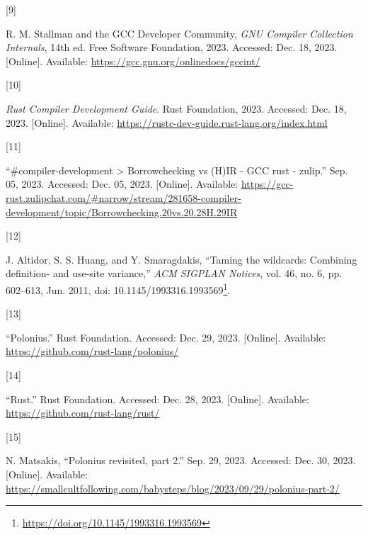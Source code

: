 \documentclass[
  11pt,
  twoside,symmetric]{report}
\newlength{\cslhangindent}
\newlength{\csllabelwidth}
\newlength{\cslentryspacingunit} %
\newenvironment{CSLReferences}[2] %
 {%
  \setlength{\parindent}{0pt}
  \ifodd #1
  \let\oldpar\par
  \def\par{\hangindent=\cslhangindent\oldpar}
  \fi
  \setlength{\parskip}{#2\cslentryspacingunit}
 }%
 {}
\newcommand{\CSLLeftMargin}[1]{\parbox[t]{\csllabelwidth}{#1}}
\newcommand{\CSLRightInline}[1]{\parbox[t]{\linewidth - \csllabelwidth}{#1}\break}
\DeclareRobustCommand{\href}[2]{#2\footnote{\url{#1}}}
\begin{document}
\begin{CSLReferences}{0}{0}
\leavevmode{}%
\CSLLeftMargin{{[}9{]} }%
\CSLRightInline{R. M. Stallman and the GCC Developer Community,
\emph{{GNU} {C}ompiler {C}ollection {I}nternals}, 14th ed. Free Software
Foundation, 2023. Accessed: Dec. 18, 2023. {[}Online{]}. Available:
\url{https://gcc.gnu.org/onlinedocs/gccint/}}

\leavevmode{}%
\CSLLeftMargin{{[}10{]} }%
\CSLRightInline{\emph{{R}ust {C}ompiler {D}evelopment {G}uide}. Rust
Foundation, 2023. Accessed: Dec. 18, 2023. {[}Online{]}. Available:
\url{https://rustc-dev-guide.rust-lang.org/index.html}}

\leavevmode{}%
\CSLLeftMargin{{[}11{]} }%
\CSLRightInline{{``{\#}{c}ompiler-development \textgreater{}
{B}orrowchecking vs ({H})IR - GCC rust - zulip.''} Sep. 05, 2023.
Accessed: Dec. 05, 2023. {[}Online{]}. Available:
\url{https://gcc-rust.zulipchat.com/\#narrow/stream/281658-compiler-development/topic/Borrowchecking.20vs.20.28H.29IR}}

\leavevmode{}%
\CSLLeftMargin{{[}12{]} }%
\CSLRightInline{J. Altidor, S. S. Huang, and Y. Smaragdakis, {``Taming
the wildcards: Combining definition- and use-site variance,''} \emph{ACM
SIGPLAN Notices}, vol. 46, no. 6, pp. 602--613, Jun. 2011, doi:
\href{https://doi.org/10.1145/1993316.1993569}{10.1145/1993316.1993569}.}

\leavevmode{}%
\CSLLeftMargin{{[}13{]} }%
\CSLRightInline{{``Polonius.''} Rust Foundation. Accessed: Dec. 29,
2023. {[}Online{]}. Available:
\url{https://github.com/rust-lang/polonius/}}

\leavevmode{}%
\CSLLeftMargin{{[}14{]} }%
\CSLRightInline{{``Rust.''} Rust Foundation. Accessed: Dec. 28, 2023.
{[}Online{]}. Available: \url{https://github.com/rust-lang/rust/}}

\leavevmode{}%
\CSLLeftMargin{{[}15{]} }%
\CSLRightInline{N. Matsakis, {``Polonius revisited, part 2.''} Sep. 29,
2023. Accessed: Dec. 30, 2023. {[}Online{]}. Available:
\url{https://smallcultfollowing.com/babysteps/blog/2023/09/29/polonius-part-2/}}

\end{CSLReferences}
\end{document}
